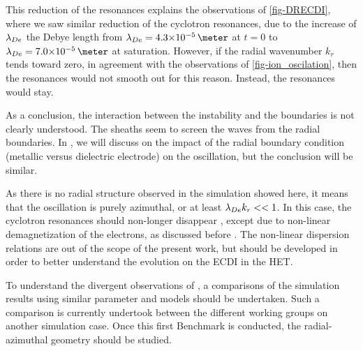   This reduction of the resonances explains the observations of \cref{fig-DRECDI}, where we saw similar reduction of the cyclotron resonances, due to the increase of $\lambda_{De}$ the Debye length from $\lde=\sn{4.3}{-5}\,\meter$ at $t=0$ to $\lde=\sn{7.0}{-5}\,\meter$ at saturation.
  However, if the radial wavenumber $k_r$ tends toward zero, in agreement with the observations of \cref{fig-ion_oscilation}, then the resonances would not smooth out for this reason.
  Instead, the resonances would stay.
  
  \vspace{1em}
  As a conclusion, the interaction between the instability and the boundaries is not clearly understood.
  The sheaths seem to  screen the waves from the radial boundaries.
  In , we will discuss on the impact of the radial boundary condition (metallic versus dielectric electrode) on the oscillation, but the conclusion will be similar.

  As there is no radial structure observed in the simulation showed here, it means that the oscillation is purely azimuthal, or at least $\lambda_{De} k_r <<1$.
  In this case, the cyclotron resonances should non-longer disappear \citep{ducrocq2006}, except due to non-linear demagnetization of the electrons, as discussed before \citep{boeuf2018,taccogna2019}.
  The non-linear dispersion relations are out of the scope of the present work, but should be developed in order to better understand the evolution on the \ac{ECDI} in the \ac{HET}.
  
  To understand the divergent observations of \citet{hara2019a,janhunen2018,taccogna2019}, a comparisons of the simulation results using similar parameter and models should be undertaken.
  Such a comparison is currently undertook between the different working groups on another simulation case. 
  Once this first Benchmark is conducted, the radial-azimuthal geometry should be studied.
  
  
  
  